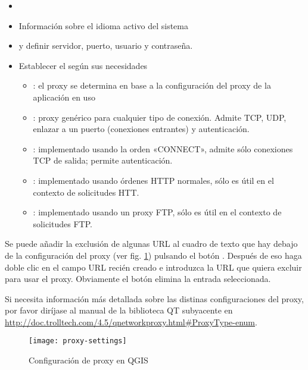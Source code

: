 
\begin{itemize}
\item {}
\item Información sobre el idioma activo del sistema
\end{itemize}


\begin{itemize}
\item {} y definir servidor, puerto, usuario y
contraseña.
\item Establecer el  según sus necesidades
 \begin{itemize}
  \item {}: el proxy se determina en base a la configuración del proxy de la aplicación en uso
  \item {}: proxy genérico para cualquier tipo de conexión. Admite TCP, UDP, enlazar a un puerto (conexiones entrantes) y autenticación.
  \item {}: implementado usando la orden «CONNECT», admite sólo conexiones TCP de salida; permite autenticación.
  \item {}: implementado usando órdenes HTTP normales, sólo es útil en el contexto de solicitudes HTT.
  \item {}: implementado usando un proxy FTP, sólo es útil en el contexto de solicitudes FTP.
 \end{itemize}
\end{itemize}

Se puede añadir la exclusión de algunas URL al cuadro de texto que hay debajo de la configuración del proxy (ver
fig. \ref{fig:proxy-settings}) pulsando el botón . Después de eso
haga doble clic en el campo 
URL recién creado e introduzca la URL que quiera excluir para usar el proxy. Obviamente el botón  
elimina la entrada seleccionada.

Si necesita información más detallada sobre las distinas configuraciones del proxy,
por favor diríjase al manual de la biblioteca QT subyacente en
\url{http://doc.trolltech.com/4.5/qnetworkproxy.html#ProxyType-enum}.

\begin{figure}[ht]
   \begin{center}
   \caption{Configuración de proxy en QGIS \nixcaption}
   \texttt{[image: proxy-settings]}
   \label{fig:proxy-settings}
\end{center} 
\end{figure}

